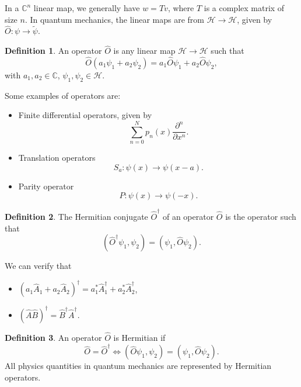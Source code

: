 \documentclass[12pt]{article}
\theoremstyle{definition}
\newtheorem{definition}{Definition}[section]
\theoremstyle{remark}
\begin{document}
In a $\mathbb{C}^{n}$ linear map, we generally have $w = Tv$, where $T$ is a complex matrix of size $n$. In quantum mechanics, the linear maps are from $\mathcal{H} \to \mathcal{H}$, given by $\hat O : \psi \to \tilde \psi$.

\begin{definition}
	An operator $\hat O$ is any linear map $\mathcal{H} \to \mathcal{H}$ such that
	\[
		\hat O(a_1 \psi_1 + a_2 \psi_2) = a_1 \hat O \psi_1 + a_2 \hat O \psi_2
	,\]
	with $a_1, a_2 \in \mathbb{C}$, $\psi_1, \psi_2 \in \mathcal{H}$.
\end{definition}

Some examples of operators are:
\begin{itemize}
	\item Finite differential operators, given by
		\[
			\sum_{n = 0}^{N} p_n(x) \frac{\partial^{n}}{\partial x^{n}}
		.\]
	\item Translation operators
		\[
			S_a : \psi(x) \to \psi(x - a)
		.\]
	\item Parity operator
		\[
			P : \psi(x) \to \psi(-x)
		.\]
\end{itemize}

\begin{definition}
	The Hermitian conjugate $\hat O^{\dagger}$ of an operator $\hat O$ is the operator such that
	\[
		(\hat O^{\dagger} \psi_1, \psi_2) = (\psi_1, \hat O \psi_2)
	.\]
\end{definition}
We can verify that
\begin{itemize}
	\item $(a_1 \hat A_1 + a_2 \hat A_2)^{\dagger} = a_1^{\ast}\hat A_1^{\dagger} + a_2^{\ast} \hat A_2^{\dagger}$,
	\item $(\hat A \hat B)^{\dagger} = \hat B^{\dagger} \hat A^{\dagger}$.
\end{itemize}

\begin{definition}
	An operator $\hat O$ is Hermitian if
	\[
		\hat O = \hat O^{\dagger} \iff (\hat O \psi_1, \psi_2) = (\psi_1, \hat O \psi_2)
	.\]
	All physics quantities in quantum mechanics are represented by Hermitian operators.
\end{definition}
\end{document}
